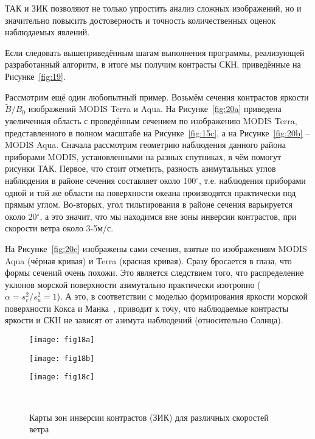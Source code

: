ТАК и ЗИК позволяют не только упростить анализ сложных изображений, но и значительно повысить достоверность и точность количественных оценок наблюдаемых явлений.

Если следовать вышеприведённым шагам выполнения программы, реализующей разработанный алгоритм, в итоге мы получим контрасты СКН, приведённые на Рисунке~\ref{fig:19}.

Рассмотрим ещё один любопытный пример. Возьмём сечения контрастов яркости $\tilde{B}/B_{0}$ изображений MODIS Terra и Aqua. На Рисунке~\ref{fig:20a} приведена увеличенная область с проведённым сечением по изображению MODIS Terra, представленного в полном масштабе на Рисунке~\ref{fig:15c},  а на Рисунке~\ref{fig:20b} --  MODIS Aqua. Сначала рассмотрим геометрию наблюдения данного района приборами MODIS, установленными на разных спутниках, в чём помогут рисунки ТАК. Первое, что стоит отметить, разность азимутальных углов наблюдения в районе сечения составляет около 100${}^\circ$, т.е. наблюдения приборами одной и той же области на поверхности океана производятся практически под прямым углом. Во-вторых, угол тильтирования в районе сечения варьируется около 20${}^\circ$, а это значит, что мы находимся вне зоны инверсии контрастов, при скорости ветра около 3-5м/с.

На Рисунке~\ref{fig:20c} изображены сами сечения, взятые по изображениям MODIS Aqua (чёрная кривая) и Terra (красная кривая). Сразу бросается в глаза, что формы сечений очень похожи. Это является следствием того, что распределение уклонов морской поверхности азимутально практически изотропно ($\alpha =s_{c}^{2} /s_{u}^{2} =1$). А это, в соответствии с моделью формирования яркости морской поверхности Кокса и Манка~\citep{Cox1954}, приводит к точу, что наблюдаемые контрасты яркости и СКН не зависят от азимута наблюдений (относительно Солнца).


\begin{figure}[!thb]
    	\centering
	\begin{minipage}{.33\textwidth}
	    \subcaptionbox{\label{fig:18a}}
		{\texttt{[image: fig18a]}}
	\end{minipage}
	\hfill
	\begin{minipage}{.31\textwidth}
	    \subcaptionbox{\label{fig:18b}}
		{\texttt{[image: fig18b]}}
	\end{minipage}
	\hfill
	\begin{minipage}{.31\textwidth}
	    \subcaptionbox{\label{fig:18c}}
		{\texttt{[image: fig18c]}}
	\end{minipage}
	\\
    \caption{Карты зон инверсии контрастов (ЗИК) для различных скоростей ветра}
    \label{fig:18}
\end{figure}


